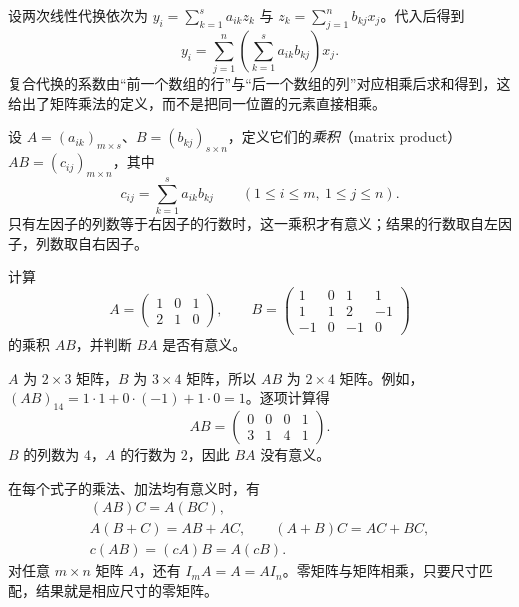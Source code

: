设两次线性代换依次为 $y_i=\sum_{k=1}^{s}a_{ik}z_k$ 与 $z_k=\sum_{j=1}^{n}b_{kj}x_j$。代入后得到
\[
    y_i=\sum_{j=1}^{n}\left(\sum_{k=1}^{s}a_{ik}b_{kj}\right)x_j.
\]
复合代换的系数由“前一个数组的行”与“后一个数组的列”对应相乘后求和得到，这给出了矩阵乘法的定义，而不是把同一位置的元素直接相乘。

\begin{definition}
\label{def:matrix-product}
设 $A=(a_{ik})_{m\times s}$、$B=(b_{kj})_{s\times n}$，定义它们的\emph{乘积}（matrix product）$AB=(c_{ij})_{m\times n}$，其中
\begin{equation}
\label{eq:matrix-product-entry}
    c_{ij}=\sum_{k=1}^{s}a_{ik}b_{kj}
    \qquad(1\leq i\leq m,\ 1\leq j\leq n).
\end{equation}
只有左因子的列数等于右因子的行数时，这一乘积才有意义；结果的行数取自左因子，列数取自右因子。
\end{definition}

\begin{example}
\label{ex:matrix-rectangular-product}
计算
\[
    A=\begin{pmatrix}1&0&1\\2&1&0\end{pmatrix},\qquad
    B=\begin{pmatrix}1&0&1&1\\1&1&2&-1\\-1&0&-1&0\end{pmatrix}
\]
的乘积 $AB$，并判断 $BA$ 是否有意义。
\end{example}

\begin{solve}
$A$ 为 $2\times3$ 矩阵，$B$ 为 $3\times4$ 矩阵，所以 $AB$ 为 $2\times4$ 矩阵。例如，$(AB)_{14}=1\cdot1+0\cdot(-1)+1\cdot0=1$。逐项计算得
\[
    AB=\begin{pmatrix}0&0&0&1\\3&1&4&1\end{pmatrix}.
\]
$B$ 的列数为 $4$，$A$ 的行数为 $2$，因此 $BA$ 没有意义。
\end{solve}

\begin{proposition}[矩阵乘法的基本规则]
\label{prop:matrix-multiplication-laws}
在每个式子的乘法、加法均有意义时，有
\[
    \begin{gathered}
        (AB)C=A(BC),\\
        A(B+C)=AB+AC,\qquad (A+B)C=AC+BC,\\
        c(AB)=(cA)B=A(cB).
    \end{gathered}
\]
对任意 $m\times n$ 矩阵 $A$，还有 $I_mA=A=AI_n$。零矩阵与矩阵相乘，只要尺寸匹配，结果就是相应尺寸的零矩阵。
\end{proposition}

